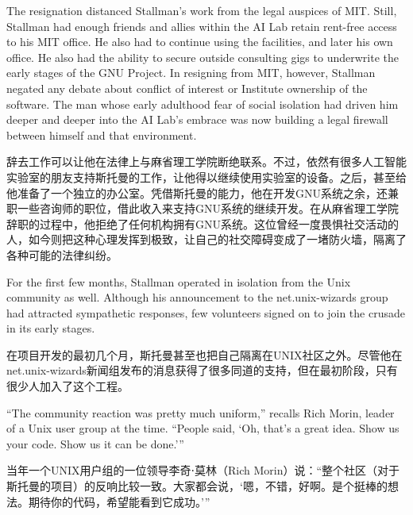 \ifdefined\eng
The resignation distanced Stallman's work from the legal auspices of MIT. Still, Stallman had enough friends and allies within the AI Lab \ifdefined\vone retain rent-free access to his MIT office. He also had \fi\ifdefined\vtwo to continue using the facilities, and later his own office. He also had the \fi ability to secure outside consulting gigs to underwrite the early stages of the GNU Project. In resigning from MIT, however, Stallman negated any debate about conflict of interest or Institute ownership of the software. The man whose early adulthood fear of social isolation had driven him deeper and deeper into the AI Lab's embrace was now building a legal firewall between himself and that environment.
\fi

\ifdefined\chs
辞去工作可以让他在法律上与麻省理工学院断绝联系。不过，依然有很多人工智能实验室的朋友支持斯托曼的工作，让他得以继续使用实验室的设备。\ifdefined\vtwo 之后，甚至给他准备了一个独立的办公室。\fi 凭借斯托曼的能力，他在开发GNU系统之余，还兼职一些咨询师的职位，借此收入来支持GNU系统的继续开发。在从麻省理工学院辞职的过程中，他拒绝了任何机构拥有GNU系统。这位曾经一度畏惧社交活动的人，如今则把这种心理发挥到极致，让自己的社交障碍变成了一堵防火墙，隔离了各种可能的法律纠纷。
\fi

\ifdefined\eng
For the first few months, Stallman operated in isolation from the Unix community as well. Although his announcement to the net.unix-wizards group had attracted sympathetic responses, few volunteers signed on to join the crusade in its early stages.
\fi

\ifdefined\chs
在项目开发的最初几个月，斯托曼甚至也把自己隔离在UNIX社区之外。尽管他在net.unix-wizards新闻组发布的消息获得了很多同道的支持，但在最初阶段，只有很少人加入了这个工程。
\fi

\ifdefined\eng
``The community reaction was pretty much uniform,'' recalls Rich Morin, leader of a Unix user group at the time. ``People said, `Oh, that's a great idea. Show us your code. Show us it can be done.'\hspace{0.01in}''
\fi

\ifdefined\chs
当年一个UNIX用户组的一位领导李奇⋅莫林（Rich Morin）说：``整个社区（对于斯托曼的项目）的反响比较一致。大家都会说，`嗯，不错，好啊。是个挺棒的想法。期待你的代码，希望能看到它成功。'\hspace{0.01in}''
\fi

